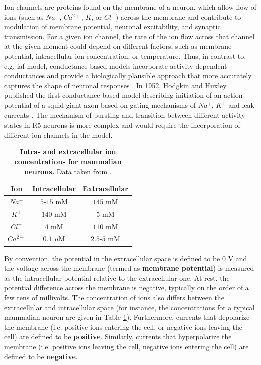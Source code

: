 \documentclass[../main.tex]{subfiles}
\begin{document}
Ion channels are proteins found on the membrane of a neuron, which allow flow of ions (such as $Na^+$, $Ca^{2+}$, $K$, or $Cl^-$) across the membrane and contribute to modulation of membrane potential, neuronal excitability, and synaptic transmission. For a given ion channel, the rate of the ion flow across that channel at the given moment could depend on different factors, such as membrane potential, intracellular ion concentration, or temperature. Thus, in contrast to, e.g. \gls{iaf} model, conductance-based models incorporate activity-dependent conductances and provide a biologically plausible approach that more accurately captures the shape of neuronal responses \cite{destexheConductanceBasedIntegrateandFireModels1997}. In 1952, Hodgkin and Huxley published the first conductance-based model describing initiation of an action potential of a squid giant axon based on gating mechanisms of $Na^{+}$, $K^+$ and leak currents \cite{hodgkinQuantitativeDescriptionMembrane1952}. The mechanism of bursting and transition between different activity states in R5 neurons is more complex and would require the incorporation of different ion channels in the model.

\begin{table}[!b]
    \centering
    \begin{tabular}{|c|c|c|}
        \hline
        Ion & Intracellular & Extracellular \\
        \hline
        \hline
        $Na^+$     & $5$-$15$ mM    & $145$ mM    \\
        $K^+$      & $140$ mM       & $5$ mM      \\
        $Cl^-$     & $4$ mM         & $110$ mM    \\
        $Ca^{2+}$  & $0.1$ $\mu$M   & $2.5$-$5$ mM \\
        \hline
    \end{tabular}
    \caption[Intra- and extracellular ion concentrations for mammalian neurons]{
        \textbf{Intra- and extracellular ion concentrations for mammalian neurons.}
        Data taken from \cite{izhikevichDynamicalSystemsNeuroscience2006}.
    }
    \label{tab:typical_ion_concentrations_in_mammaly}
\end{table}

By convention, the potential in the extracellular space is defined to be $0$ V and the voltage across the membrane (termed as \textbf{membrane potential}) is measured as the intracellular potential relative to the extracellular one. At rest, the potential difference across the membrane is negative, typically on the order of a few tens of millivolts. The concentration of ions also differs between the extracellular and intracellular space (for instance, the concentrations for a typical mammalian neuron are given in Table \ref{tab:typical_ion_concentrations_in_mammaly}). Furthermore, currents that depolarize the membrane (i.e. positive ions entering the cell, or negative ions leaving the cell) are defined to be \textbf{positive}. Similarly, currents that hyperpolarize the membrane (i.e. positive ions leaving the cell, negative ions entering the cell) are defined to be \textbf{negative}.
\end{document}
